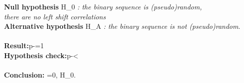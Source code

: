 \documentclass{article}
\begin{document}
\textbf{Null hypothesis } H_0 \textit{: the binary sequence is (pseudo)random,}\\\textit{there are no left shift correlations} \\\textbf{Alternative hypothesis } H_A \textit{: the binary sequence is not (pseudo)random}.\\\\\textbf{Result:}\space\space\space\space\space\space\space\space\space\space\space\space\space\space\space\space\space\space\space\space\space\space\space\space\space\space p-={1}\\\textbf{Hypothesis check:}\space\space\space\space\space p-<\alpha\\\\\textbf{Conclusion: }\alpha={0}, H_0\bbox[#CC3333, 5px]{\color{white}{rejected}}.
\end{document}
